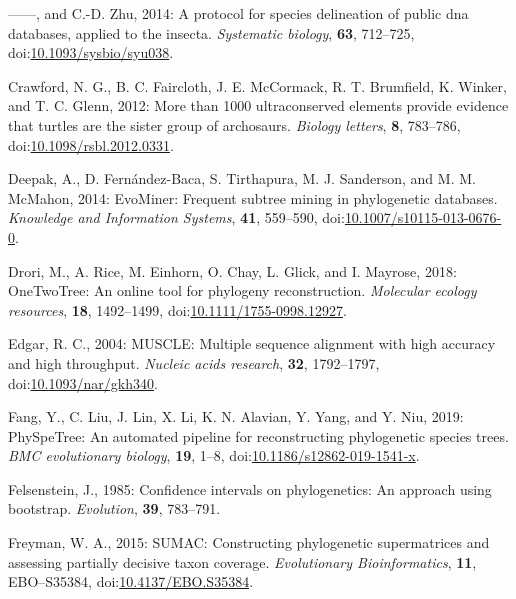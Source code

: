 \documentclass[draft]{ametsoc}
\begin{document}
\leavevmode\hypertarget{ref-chesters2014protocol}{}%
------, and C.-D. Zhu, 2014: A protocol for species delineation of
public dna databases, applied to the insecta. \emph{Systematic biology},
\textbf{63}, 712--725,
doi:\href{https://doi.org/10.1093/sysbio/syu038}{10.1093/sysbio/syu038}.

\leavevmode\hypertarget{ref-crawford2012more}{}%
Crawford, N. G., B. C. Faircloth, J. E. McCormack, R. T. Brumfield, K.
Winker, and T. C. Glenn, 2012: More than 1000 ultraconserved elements
provide evidence that turtles are the sister group of archosaurs.
\emph{Biology letters}, \textbf{8}, 783--786,
doi:\href{https://doi.org/10.1098/rsbl.2012.0331}{10.1098/rsbl.2012.0331}.

\leavevmode\hypertarget{ref-deepak2014evominer}{}%
Deepak, A., D. Fernández-Baca, S. Tirthapura, M. J. Sanderson, and M. M.
McMahon, 2014: EvoMiner: Frequent subtree mining in phylogenetic
databases. \emph{Knowledge and Information Systems}, \textbf{41},
559--590,
doi:\href{https://doi.org/10.1007/s10115-013-0676-0}{10.1007/s10115-013-0676-0}.

\leavevmode\hypertarget{ref-drori2018onetwotree}{}%
Drori, M., A. Rice, M. Einhorn, O. Chay, L. Glick, and I. Mayrose, 2018:
OneTwoTree: An online tool for phylogeny reconstruction. \emph{Molecular
ecology resources}, \textbf{18}, 1492--1499,
doi:\href{https://doi.org/10.1111/1755-0998.12927}{10.1111/1755-0998.12927}.

\leavevmode\hypertarget{ref-edgar2004muscle}{}%
Edgar, R. C., 2004: MUSCLE: Multiple sequence alignment with high
accuracy and high throughput. \emph{Nucleic acids research},
\textbf{32}, 1792--1797,
doi:\href{https://doi.org/10.1093/nar/gkh340}{10.1093/nar/gkh340}.

\leavevmode\hypertarget{ref-fang2019physpetree}{}%
Fang, Y., C. Liu, J. Lin, X. Li, K. N. Alavian, Y. Yang, and Y. Niu,
2019: PhySpeTree: An automated pipeline for reconstructing phylogenetic
species trees. \emph{BMC evolutionary biology}, \textbf{19}, 1--8,
doi:\href{https://doi.org/10.1186/s12862-019-1541-x}{10.1186/s12862-019-1541-x}.

\leavevmode\hypertarget{ref-felsenstein1985confidence}{}%
Felsenstein, J., 1985: Confidence intervals on phylogenetics: An
approach using bootstrap. \emph{Evolution}, \textbf{39}, 783--791.

\leavevmode\hypertarget{ref-freyman2015sumac}{}%
Freyman, W. A., 2015: SUMAC: Constructing phylogenetic supermatrices and
assessing partially decisive taxon coverage. \emph{Evolutionary
Bioinformatics}, \textbf{11}, EBO--S35384,
doi:\href{https://doi.org/10.4137/EBO.S35384}{10.4137/EBO.S35384}.
\end{document}
